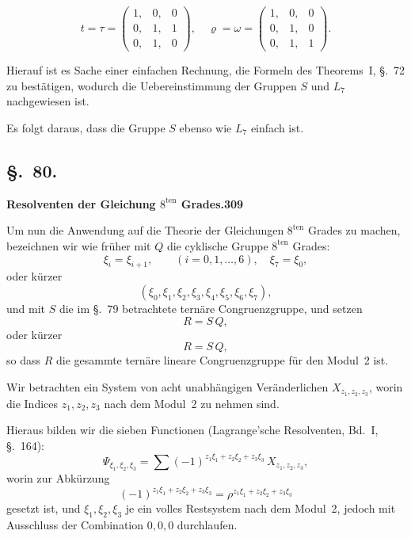 \documentclass[12pt,a4paper]{article}
\begin{document}
\begin{equation}
\tag{5}
t = \tau =
\begin{pmatrix} 1,& 0,& 0\\ 0,& 1,& 1\\ 0,& 1,& 0\end{pmatrix},\quad
\varrho = \omega =
\begin{pmatrix} 1,& 0,& 0\\ 0,& 1,& 0\\ 0,& 1,& 1\end{pmatrix}.
\end{equation}

Hierauf ist es Sache einer einfachen Rechnung, die Formeln des Theorems~I, \S.~72 zu best\"atigen, wodurch die Uebereinstimmung der Gruppen $S$ und $L_7$ nachgewiesen ist.

Es folgt daraus, dass die Gruppe $S$ ebenso wie $L_7$ einfach ist.

\subsection*{\S.~80.}
\textbf{Resolventen der Gleichung $8^{\text{ten}}$ Grades.}\hfill\textbf{309}\\[4pt]

Um nun die Anwendung auf die Theorie der Gleichungen $8^{\text{ten}}$ Grades zu machen, bezeichnen wir wie fr\"uher mit $Q$ die cyklische Gruppe $8^{\text{ten}}$ Grades:
\begin{equation}
\tag{1}
\xi_i = \xi_{i+1},\qquad (i=0,1,\ldots,6),\quad \xi_7 = \xi_0,
\end{equation}
oder k\"urzer
\[
(\xi_0,\xi_1,\xi_2,\xi_3,\xi_4,\xi_5,\xi_6,\xi_7),
\]
und mit $S$ die im \S.~79 betrachtete tern\"are Congruenzgruppe, und setzen
\[
R = S\,Q,
\]
oder k\"urzer
\begin{equation}
\tag{2}
R = S\,Q,
\end{equation}
so dass $R$ die gesammte tern\"are lineare Congruenzgruppe f\"ur den Modul~2 ist.

Wir betrachten ein System von acht unabh\"angigen Ver\"anderlichen $X_{z_1,z_2,z_3}$, worin die Indices $z_1,z_2,z_3$ nach dem Modul~2 zu nehmen sind.

Hieraus bilden wir die sieben Functionen (Lagrange'sche Resolventen, Bd.~I, \S.~164):
\begin{equation}
\tag{3}
\Psi_{\xi_1,\xi_2,\xi_3} = \sum (-1)^{z_1\xi_1+z_2\xi_2+z_3\xi_3}\,X_{z_1,z_2,z_3},
\end{equation}
worin zur Abk\"urzung
\[
(-1)^{z_1\xi_1+z_2\xi_2+z_3\xi_3} = \rho^{z_1\xi_1+z_2\xi_2+z_3\xi_3}
\]
gesetzt ist, und $\xi_1,\xi_2,\xi_3$ je ein volles Restsystem nach dem Modul~2, jedoch mit Ausschluss der Combination $0,0,0$ durchlaufen.
\end{document}
